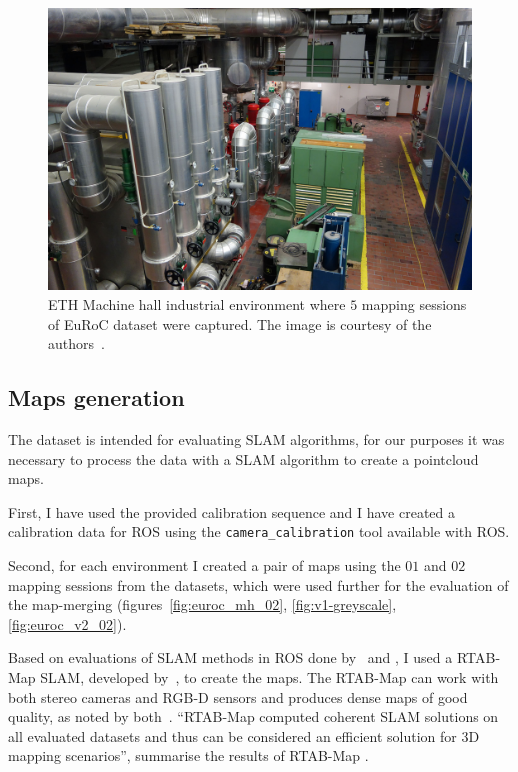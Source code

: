 \begin{figure}
    \centering
    \includegraphics[width=\textwidth]{../img/eth_machine_room.jpg}
    \caption[ETH Machine hall]{ETH Machine hall industrial environment where $5$ mapping sessions of EuRoC dataset were captured. The image is courtesy of the authors~\citep{Burri2016}.}
    \label{fig:eth-machine-hall}
\end{figure}

\subsection{Maps generation}
\label{sec:euroc-generating-maps}

The dataset is intended for evaluating \gls{SLAM} algorithms, for our purposes it was necessary to process the data with a \gls{SLAM} algorithm to create a pointcloud maps.

First, I have used the provided calibration sequence and I have created a calibration data for \gls{ROS} using the \texttt{camera\_calibration} tool available with \gls{ROS}.

Second, for each environment I created a pair of maps using the $01$ and $02$ mapping sessions from the datasets, which were used further for the evaluation of the map-merging (figures~\ref{fig:euroc_mh_02}, \ref{fig:v1-greyscale}, \ref{fig:euroc_v2_02}).

Based on evaluations of \gls{SLAM} methods in \gls{ROS} done by~\citet{silva2017experimental} and \citet{ibragimov2017comparison}, I used a RTAB-Map \gls{SLAM}, developed by~\citet{labbe2014online}, to create the maps. The RTAB-Map can work with both stereo cameras and \gls{RGB-D} sensors and produces dense maps of good quality, as noted by both~\citet{silva2017experimental,ibragimov2017comparison}. ``RTAB-Map computed coherent SLAM solutions on all evaluated datasets and thus can be considered an efficient solution for 3D mapping scenarios'', summarise the results of RTAB-Map \citet{silva2017experimental}.

